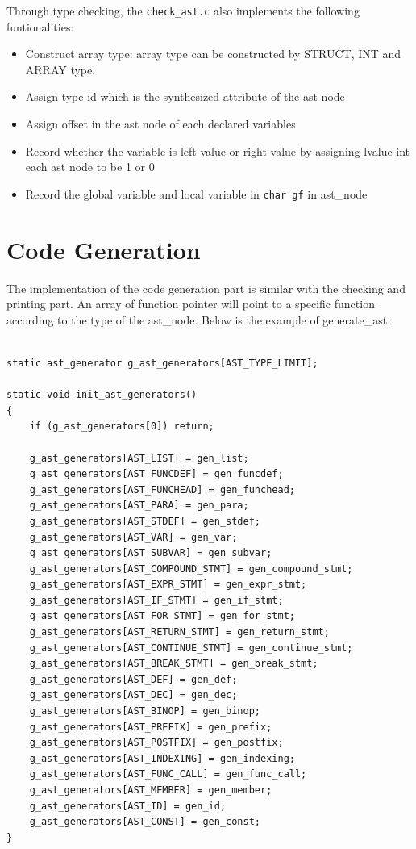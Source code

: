 \documentclass[a4paper]{article}
\begin{document}
Through type checking, the \texttt{check\_ast.c} also implements the following funtionalities:
\begin{itemize}
    \item Construct array type: array type can be constructed by STRUCT, INT and ARRAY type.
    \item Assign type id which is the synthesized attribute of the ast node
    \item Assign offset in the ast node of each declared variables
    \item Record whether the variable is left-value or right-value by assigning lvalue int each ast node to be 1 or 0
    \item Record the global variable and local variable in \texttt{char gf} in ast\_node
\end{itemize}


\section{Code Generation}

The implementation of the code generation part is similar with the checking and printing part. An array of function pointer will point to a specific function according to the type of the ast\_node. Below is the example of generate\_ast: 

\begin{verbatim}

static ast_generator g_ast_generators[AST_TYPE_LIMIT];

static void init_ast_generators()
{
    if (g_ast_generators[0]) return;

    g_ast_generators[AST_LIST] = gen_list;
    g_ast_generators[AST_FUNCDEF] = gen_funcdef;
    g_ast_generators[AST_FUNCHEAD] = gen_funchead;
    g_ast_generators[AST_PARA] = gen_para;
    g_ast_generators[AST_STDEF] = gen_stdef;
    g_ast_generators[AST_VAR] = gen_var;
    g_ast_generators[AST_SUBVAR] = gen_subvar;
    g_ast_generators[AST_COMPOUND_STMT] = gen_compound_stmt;
    g_ast_generators[AST_EXPR_STMT] = gen_expr_stmt;
    g_ast_generators[AST_IF_STMT] = gen_if_stmt;
    g_ast_generators[AST_FOR_STMT] = gen_for_stmt;
    g_ast_generators[AST_RETURN_STMT] = gen_return_stmt;
    g_ast_generators[AST_CONTINUE_STMT] = gen_continue_stmt;
    g_ast_generators[AST_BREAK_STMT] = gen_break_stmt;
    g_ast_generators[AST_DEF] = gen_def;
    g_ast_generators[AST_DEC] = gen_dec;
    g_ast_generators[AST_BINOP] = gen_binop;
    g_ast_generators[AST_PREFIX] = gen_prefix;
    g_ast_generators[AST_POSTFIX] = gen_postfix;
    g_ast_generators[AST_INDEXING] = gen_indexing;
    g_ast_generators[AST_FUNC_CALL] = gen_func_call;
    g_ast_generators[AST_MEMBER] = gen_member;
    g_ast_generators[AST_ID] = gen_id;
    g_ast_generators[AST_CONST] = gen_const;
}

\end{verbatim}
\end{document}
